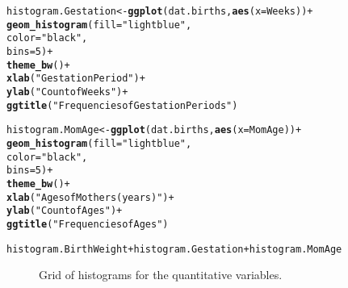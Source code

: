 \documentclass{article}\usepackage[]{graphicx}\usepackage[]{xcolor}
\makeatletter
\newcommand{\hlnum}[1]{\textcolor[rgb]{0.686,0.059,0.569}{#1}}%
\newcommand{\hlstr}[1]{\textcolor[rgb]{0.192,0.494,0.8}{#1}}%
\newcommand{\hlopt}[1]{\textcolor[rgb]{0,0,0}{#1}}%
\newcommand{\hlstd}[1]{\textcolor[rgb]{0.345,0.345,0.345}{#1}}%
\newcommand{\hlkwb}[1]{\textcolor[rgb]{0.69,0.353,0.396}{#1}}%
\newcommand{\hlkwc}[1]{\textcolor[rgb]{0.333,0.667,0.333}{#1}}%
\newcommand{\hlkwd}[1]{\textcolor[rgb]{0.737,0.353,0.396}{\textbf{#1}}}%
\newenvironment{kframe}{%
 \def\at@end@of@kframe{}%
 \ifinner\ifhmode%
  \def\at@end@of@kframe{\end{minipage}}%
  \begin{minipage}{\columnwidth}%
 \fi\fi%
 \def\FrameCommand##1{\hskip\@totalleftmargin \hskip-\fboxsep
 \colorbox{shadecolor}{##1}\hskip-\fboxsep
     \hskip-\linewidth \hskip-\@totalleftmargin \hskip\columnwidth}%
 \MakeFramed {\advance\hsize-\width
   \@totalleftmargin\z@ \linewidth\hsize
   \@setminipage}}%
 {\par\unskip\endMakeFramed%
 \at@end@of@kframe}
\newenvironment{knitrout}{}{} %
\makeatother
\begin{document}
\begin{enumerate}[a.]
\begin{knitrout}
\begin{kframe}
\begin{alltt}
\hlstd{histogram.Gestation}\hlkwb{<-} \hlkwd{ggplot}\hlstd{(dat.births,} \hlkwd{aes}\hlstd{(}\hlkwc{x}\hlstd{=Weeks))}\hlopt{+}
  \hlkwd{geom_histogram}\hlstd{(}\hlkwc{fill} \hlstd{=} \hlstr{"lightblue"}\hlstd{,}
                 \hlkwc{color} \hlstd{=} \hlstr{"black"}\hlstd{,}
                 \hlkwc{bins} \hlstd{=} \hlnum{5}\hlstd{)} \hlopt{+}
  \hlkwd{theme_bw}\hlstd{()} \hlopt{+}
  \hlkwd{xlab}\hlstd{(}\hlstr{"Gestation Period"}\hlstd{)}\hlopt{+}
  \hlkwd{ylab}\hlstd{(}\hlstr{"Count of Weeks"}\hlstd{)}\hlopt{+}
  \hlkwd{ggtitle}\hlstd{(}\hlstr{"Frequencies of Gestation Periods"}\hlstd{)}

\hlstd{histogram.MomAge} \hlkwb{<-} \hlkwd{ggplot}\hlstd{(dat.births,} \hlkwd{aes}\hlstd{(}\hlkwc{x}\hlstd{=MomAge))}\hlopt{+}
  \hlkwd{geom_histogram}\hlstd{(}\hlkwc{fill} \hlstd{=} \hlstr{"lightblue"}\hlstd{,}
                 \hlkwc{color} \hlstd{=} \hlstr{"black"}\hlstd{,}
                 \hlkwc{bins} \hlstd{=} \hlnum{5}\hlstd{)} \hlopt{+}
  \hlkwd{theme_bw}\hlstd{()} \hlopt{+}
  \hlkwd{xlab}\hlstd{(}\hlstr{"Ages of Mothers(years)"}\hlstd{)}\hlopt{+}
  \hlkwd{ylab}\hlstd{(}\hlstr{"Count of Ages"}\hlstd{)}\hlopt{+}
  \hlkwd{ggtitle}\hlstd{(}\hlstr{"Frequencies of Ages"}\hlstd{)}

\hlstd{histogram.BirthWeight} \hlopt{+} \hlstd{histogram.Gestation} \hlopt{+} \hlstd{histogram.MomAge}
\end{alltt}
\end{kframe}
\end{knitrout}

\begin{figure}[H]
\centering
\begin{knitrout}
\color{fgcolor}\begin{kframe}


{\ttfamily\noindent\bfseries\color{errorcolor}{\#\# Error in ggplot(dat.births, aes(x = BirthWeightGm)): object 'dat.births' not found}}

{\ttfamily\noindent\bfseries\color{errorcolor}{\#\# Error in ggplot(dat.births, aes(x = Weeks)): object 'dat.births' not found}}

{\ttfamily\noindent\bfseries\color{errorcolor}{\#\# Error in ggplot(dat.births, aes(x = MomAge)): object 'dat.births' not found}}

{\ttfamily\noindent\bfseries\color{errorcolor}{\#\# Error in eval(expr, envir, enclos): object 'histogram.BirthWeight' not found}}\end{kframe}
\end{knitrout}
\caption{Grid of histograms for the quantitative variables.}
\label{HistogramSummary}
\end{figure}


\end{enumerate}
\end{document}
